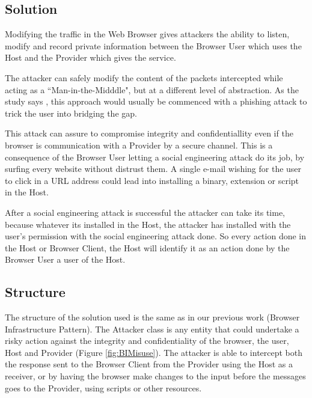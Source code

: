 \documentclass{sig-alternate-05-2015}
\begin{document}
\subsection*{Solution}
Modifying the traffic in the Web Browser gives attackers the ability to listen, modify and record private information between the Browser User which uses the Host and the Provider which gives the service.

The attacker can safely modify the content of the packets intercepted while acting as a ``Man-in-the-Midddle", but at a different level of abstraction. As the study says \cite{Dougan2012}, this approach would usually be commenced with a phishing attack to trick the user into bridging the gap.

This attack can assure to compromise integrity and confidentiallity even if the browser is communication with a Provider by a secure channel. This is a consequence of the Browser User letting a social engineering attack do its job, by surfing every website without distrust them. A single e-mail wishing for the user to click in a URL address could lead into installing a binary, extension or script in the Host.

After a social engineering attack is successful the attacker can take its time, because whatever its installed in the Host, the attacker has installed with the user's permission with the social engineering attack done. So every action done in the Host or Browser Client, the Host will identify it as an action done by the Browser User a user of the Host.


\subsection*{Structure}
The structure of the solution used is the same as in our previous work (Browser Infrastructure Pattern). The Attacker class is any entity that could undertake a risky action against the integrity and confidentiality of the browser, the user, Host and Provider (Figure \ref{fig:BIMisuse}). The attacker is able to intercept both the response sent to the Browser Client from the Provider using the Host as a receiver, or by having the browser make changes to the input before the messages goes to the Provider, using scripts or other resources.  
\end{document}
